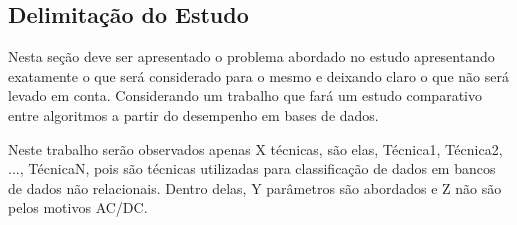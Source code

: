 

\subsection{\textbf{Delimitação do Estudo}}
    \label{sec:delimitacao-estudo}
    
    Nesta seção deve ser apresentado o problema abordado no estudo apresentando exatamente o que
    será considerado para o mesmo e deixando claro o que não será levado em conta. Considerando
    um trabalho que fará um estudo comparativo entre algoritmos a partir do desempenho em bases
    de dados.
    
    Neste trabalho serão observados apenas X técnicas, são elas, Técnica1, Técnica2, ..., TécnicaN, pois são técnicas utilizadas para classificação de dados em bancos de dados não relacionais. Dentro delas, Y parâmetros são abordados e Z não são pelos motivos AC/DC.
    
